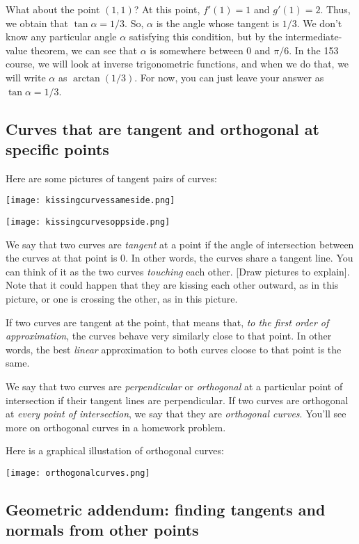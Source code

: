 \documentclass[10pt]{amsart}
\begin{document}
What about the point $(1,1)$? At this point, $f'(1) = 1$ and $g'(1) =
2$. Thus, we obtain that $\tan \alpha = 1/3$. So, $\alpha$ is the
angle whose tangent is $1/3$. We don't know any particular angle
$\alpha$ satisfying this condition, but by the intermediate-value
theorem, we can see that $\alpha$ is somewhere between $0$ and
$\pi/6$. In the 153 course, we will look at inverse trigonometric
functions, and when we do that, we will write $\alpha$ as
$\arctan(1/3)$. For now, you can just leave your answer as $\tan
\alpha = 1/3$.

\subsection{Curves that are tangent and orthogonal at specific points}

Here are some pictures of tangent pairs of curves:

\texttt{[image: kissingcurvessameside.png]}

\texttt{[image: kissingcurvesoppside.png]}

We say that two curves are {\em tangent} at a point if the angle of
intersection between the curves at that point is $0$. In other words,
the curves share a tangent line. You can think of it as the two curves
{\em touching} each other. [Draw pictures to explain]. Note that it
could happen that they are kissing each other outward, as in this
picture, or one is crossing the other, as in this picture.

If two curves are tangent at the point, that means that, {\em to the
first order of approximation}, the curves behave very similarly close
to that point. In other words, the best {\em linear} approximation to
both curves cloose to that point is the same.

We say that two curves are {\em perpendicular} or {\em orthogonal} at
a particular point of intersection if their tangent lines are
perpendicular. If two curves are orthogonal at {\em every point of
intersection}, we say that they are {\em orthogonal curves}. You'll
see more on orthogonal curves in a homework problem.

Here is a graphical illustation of orthogonal curves:

\texttt{[image: orthogonalcurves.png]}

\subsection{Geometric addendum: finding tangents and normals from other points}
\end{document}
